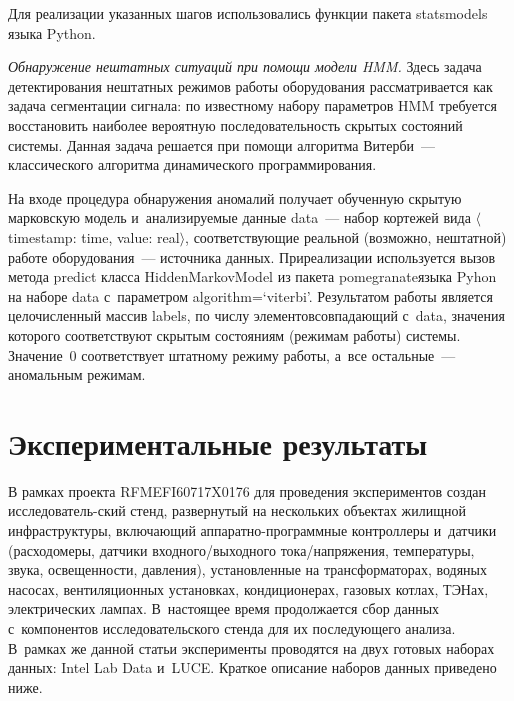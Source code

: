 \begin{multicols}{2}
      Для реализации указанных шагов использовались функции пакета 
{statsmodels} языка Python.
      
      \textit{Обнаружение нештатных ситуаций при помощи модели HMM.} 
Здесь задача детектирования нештатных режимов работы оборудования 
рассматривается как задача сегментации сигнала: по известному набору 
параметров HMM требуется восстановить наиболее вероятную 
последовательность скрытых состояний системы. Данная задача решается при 
помощи алгоритма Витерби~--- классического алгоритма динамического 
программирования.
      
      На входе процедура обнаружения аномалий получает обученную 
скрытую марковскую модель и~анализируемые данные 
{data}~--- набор кортежей вида $\langle${timestamp}: {time}, 
{value}: {real}$\rangle$, соответствующие реальной (возможно, 
нештатной) работе оборудования~--- источника данных. При\linebreak реализации 
используется вызов метода {predict} класса \mbox{HiddenMarkovModel} из 
пакета {pomegranate}\linebreak языка Pyhon на наборе {data} с~параметром 
{algorithm}\;=\;`{viterbi}'. Результатом работы является
целочисленный массив {labels}, по числу элементов\linebreak совпадающий 
с~{data}, значения которого соответствуют скрытым состояниям 
(режимам работы) сис\-те\-мы. Значение~0 соответствует штатному режиму 
работы, а~все остальные~--- аномальным режимам.

\section{Экспериментальные результаты}

      В рамках проекта RFMEFI60717X0176 для проведения экспериментов 
создан исследователь-\linebreak ский стенд, развернутый на нескольких объектах 
жилищной инфраструктуры, включающий ап\-па\-рат\-но-про\-грам\-мные 
контроллеры и~датчики (рас\-хо\-до\-ме\-ры, датчики вход\-но\-го/вы\-ход\-но\-го 
то\-ка/на\-пря\-же\-ния, температуры, звука, осве\-щен\-ности,\linebreak
 дав\-ле\-ния), установленные 
на трансформаторах, водяных насосах, вентиляционных установках, 
кондиционерах, газовых котлах, ТЭНах, электрических лампах. В~настоящее 
время продолжается сбор данных с~компонентов исследовательского стенда для 
их последующего анализа. В~рамках же данной статьи эксперименты 
проводятся на двух готовых наборах данных: {Intel Lab Data} 
и~{LUCE}. Краткое описание наборов данных приведено \mbox{ниже}.
      

\end{multicols}
